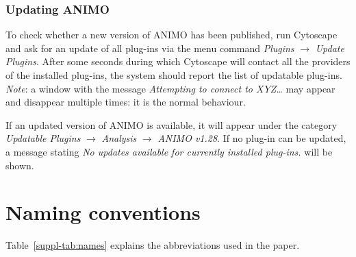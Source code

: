 \subsubsection{Updating ANIMO}
To check whether a new version of ANIMO has been published, run Cytoscape and ask for an update of all
plug-ins via the menu command \emph{Plugins} $\rightarrow$ \emph{Update Plugins}. After some seconds
during which Cytoscape will contact all the providers of the installed plug-ins,
the system should report the list of updatable plug-ins.\\
\emph{Note}: a window with the message \emph{Attempting to connect to XYZ\dots} may appear and disappear multiple times:
it is the normal behaviour.

If an updated version of ANIMO is available, it will appear
under the category \emph{Updatable Plugins} $\rightarrow$
\emph{Analysis} $\rightarrow$ \emph{ANIMO v1.28}. If no plug-in can be updated, a message stating \emph{No
updates available for currently installed plug-ins.} will be shown.




\clearpage
\section{Naming conventions}\label{suppl-sec:names}
Table~\ref{suppl-tab:names} explains the abbreviations used in the paper.

